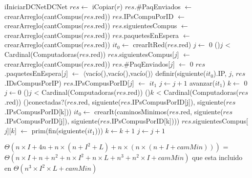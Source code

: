 \begin{Algoritmos}

  \begin{algoritmo}{iIniciarDCNet}{}{DCNet}
    $res \gets$ iCopiar($r$)   
    $res$.\#PaqEnviados $\gets$ crearArreglo(cantCompus($res$.red))   
    $res$.IPsCompuPorID $\gets$ crearArreglo(cantCompus($res$.red))   
    $res$.siguientesCompus $\gets$ crearArreglo(cantCompus($res$.red))   
    $res$.paquetesEnEspera $\gets$ crearArreglo(cantCompus($res$.red))   
     $it_{0} \gets$ crearItRed($res$.red)   
     $j \gets$ 0   
    \While(){$j$ < Cardinal(Computadoras($res$.red))}{
      $res$.siguientesCompus[$j$] $\gets$ crearArreglo(cantCompus($res$.red))   
      $res$.\#PaqEnviados[$j$] $\gets$ 0   
      $res$.paquetesEnEspera[$j$] $\gets$ $\langle$vac\'{i}o(),vac\'{i}o(),vac\'{i}o()$\rangle$   
      definir(siguiente($it_{0}$).IP, $j$, $res$.IDsCompusPorIP)   
      $res$.IPsCompusPorID[$j$] $\gets$ $it_{1}$   
      $j \gets j + 1$   
      avanzar($it_{1}$)   
    }
     $k \gets$ 0   
    $j \gets 0$   
    \While(){$j$ < Cardinal(Computadoras($res$.red))}{
      \While(){$k$ < Cardinal(Computadoras($res$.red))}{
        \If(){conectadas?($res$.red, siguiente($res$.IPsCompusPorID[j]), siguiente($res$.IPsCompusPorID[k]))}{
           $it_{0} \gets$ crearIt(caminosMinimos($res$.red, siguiente($res$.IPsCompusPorID[j]), siguiente($res$.IPsCompusPorID[k])))\;
          $res$.siguientesCompus[$j$][$k$] $\gets$ prim(fin(siguiente($it_{1}$)))   
        }
        $k \gets k + 1$  
      }
      $j \gets j + 1$  
    }
  \end{algoritmo}
 \datosAlgoritmo{} %
  {} %
  {} %
  {$\Theta(n \times I + 4 n + n \times (n + I^2 + L) + n \times (n \times (n + I + camMin)))$ = $\Theta(n \times I + n + n^2+ n \times I^2 + n \times L + n^3 + n^2 \times I + camMin)$ que esta incluido en $\Theta(n^3 \times I^2 \times L + camMin)$} %
  {} %



\end{Algoritmos}
